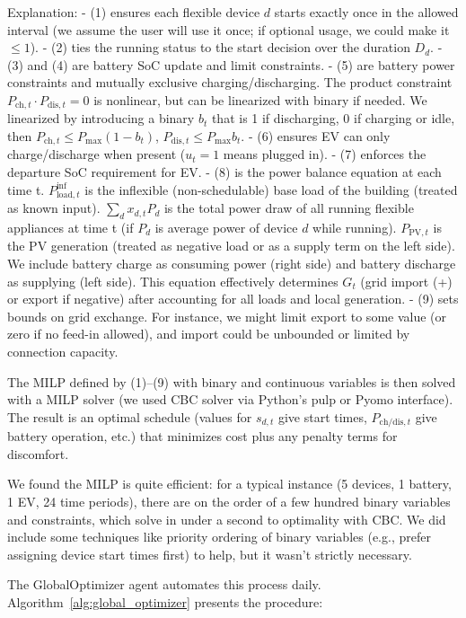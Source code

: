 \documentclass[12pt,a4paper]{article}
\begin{document}
Explanation:
- (1) ensures each flexible device $d$ starts exactly once in the allowed interval (we assume the user will use it once; if optional usage, we could make it $\le 1$).
- (2) ties the running status to the start decision over the duration $D_d$.
- (3) and (4) are battery SoC update and limit constraints.
- (5) are battery power constraints and mutually exclusive charging/discharging. The product constraint $P_{\text{ch},t} \cdot P_{\text{dis},t} = 0$ is nonlinear, but can be linearized with binary if needed. We linearized by introducing a binary $b_t$ that is 1 if discharging, 0 if charging or idle, then $P_{\text{ch},t} \le P_{\max}(1-b_t)$, $P_{\text{dis},t} \le P_{\max} b_t$.
- (6) ensures EV can only charge/discharge when present ($u_t=1$ means plugged in).
- (7) enforces the departure SoC requirement for EV.
- (8) is the power balance equation at each time t. $P_{\text{load},t}^{\text{inf}}$ is the inflexible (non-schedulable) base load of the building (treated as known input). $\sum_d x_{d,t} P_d$ is the total power draw of all running flexible appliances at time t (if $P_d$ is average power of device $d$ while running). $P_{\text{PV},t}$ is the PV generation (treated as negative load or as a supply term on the left side). We include battery charge as consuming power (right side) and battery discharge as supplying (left side). This equation effectively determines $G_t$ (grid import (+) or export if negative) after accounting for all loads and local generation.
- (9) sets bounds on grid exchange. For instance, we might limit export to some value (or zero if no feed-in allowed), and import could be unbounded or limited by connection capacity.

The MILP defined by (1)–(9) with binary and continuous variables is then solved with a MILP solver (we used CBC solver via Python’s pulp or Pyomo interface). The result is an optimal schedule (values for $s_{d,t}$ give start times, $P_{\text{ch}/\text{dis},t}$ give battery operation, etc.) that minimizes cost plus any penalty terms for discomfort.

We found the MILP is quite efficient: for a typical instance (5 devices, 1 battery, 1 EV, 24 time periods), there are on the order of a few hundred binary variables and constraints, which solve in under a second to optimality with CBC. We did include some techniques like priority ordering of binary variables (e.g., prefer assigning device start times first) to help, but it wasn’t strictly necessary.

The GlobalOptimizer agent automates this process daily. Algorithm~\ref{alg:global_optimizer} presents the procedure:
\end{document}
